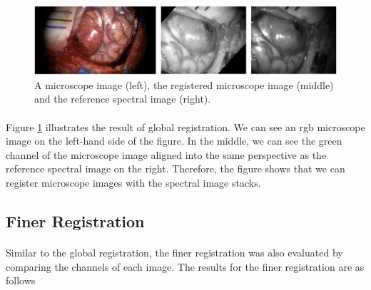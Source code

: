 \documentclass[12pt,oneside]{report}
\begin{document}
\begin{figure}[H]
\centering
\begin{minipage}[h]{\textwidth}
    \centering
    \includegraphics[width=\textwidth]{figures/global-reg.png}
    \caption{A microscope image (left), the registered microscope image (middle) and the reference spectral image (right).}
    \label{fig:global-reg}
\end{minipage}
\end{figure}

\paragraph{}
Figure \ref{fig:global-reg} illustrates the result of global registration. We can see an \acrshort{rgb} microscope image on the left-hand side of the figure. In the middle, we can see the green channel of the microscope image aligned into the same perspective as the reference spectral image on the right. Therefore, the figure shows that we can register microscope images with the spectral image stacks.

\subsection{Finer Registration}
\paragraph{}
Similar to the global registration, the finer registration was also evaluated by comparing the channels of each image. The results for the finer registration are as follows
\end{document}
